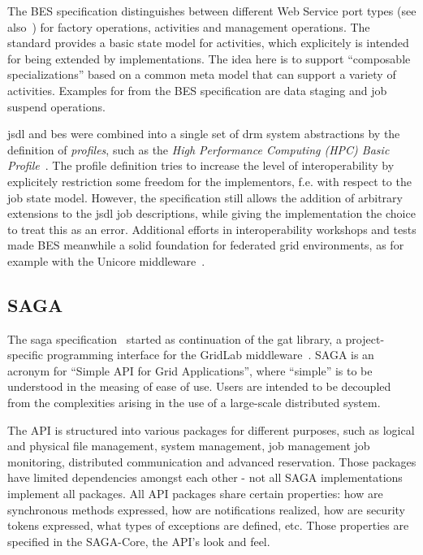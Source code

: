 \documentclass[twocolumn]{svjour3}       %
\begin{document}
The BES specification distinguishes between different Web Service port types (see also~\cite{citemaster_579}) for factory operations, activities and management operations. The standard provides a basic state model for activities, which explicitely is intended for being extended by implementations. The idea here is to support ``composable specializations'' based on a common meta model that can support a variety of activities. Examples for from the BES specification are data staging and job suspend operations.

\gls{jsdl} and \gls{bes} were combined into a single set of \gls{drm} system abstractions by the definition of \emph{profiles}, such as the \emph{High Performance Computing (HPC) Basic Profile}~\cite{citemaster_9643}. The profile definition tries to increase the level of interoperability by explicitely restriction some freedom for the implementors, f.e. with respect to the job state model. However, the specification still allows the addition of arbitrary extensions to the \gls{jsdl} job descriptions, while giving the implementation the choice to treat this as an error. Additional efforts in interoperability workshops and tests made BES meanwhile a solid foundation for federated grid environments, as for example with the Unicore middleware~\cite{citemaster_9641}.

\subsection{SAGA}

The \gls{saga} specification~\cite{saga} started as continuation of the \gls{gat} library, a project-specific programming interface for the GridLab middleware~\cite{allen03enabling}. SAGA is an acronym for ``Simple API for Grid Applications'', where ``simple'' is to be understood in the measing of ease of use. Users are intended to be decoupled from the complexities arising in the use of a large-scale distributed system. 

The API is structured into various packages for different purposes, such as logical and physical file management, system management, job management job monitoring, distributed communication and advanced reservation.  Those packages have limited dependencies amongst each other - not all SAGA implementations implement all packages.  All API packages share certain properties: how are synchronous methods expressed, how are notifications realized, how are security tokens expressed, what types of exceptions are defined, etc.  Those properties are specified in the SAGA-Core, the API's look and feel.
\end{document}
